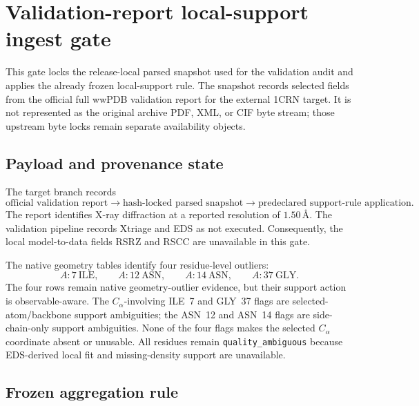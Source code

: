 \section{Validation-report local-support ingest gate}

This gate locks the release-local parsed snapshot used for the validation audit and applies the already frozen local-support rule.  The snapshot records selected fields from the official full wwPDB validation report for the external 1CRN target.  It is not represented as the original archive PDF, XML, or CIF byte stream; those upstream byte locks remain separate availability objects.

\subsection{Payload and provenance state}

The target branch records
\[
\text{official validation report}
\longrightarrow
\text{hash-locked parsed snapshot}
\longrightarrow
\text{predeclared support-rule application}.
\]
The report identifies X-ray diffraction at a reported resolution of $1.50\,\text{\AA}$.  The validation pipeline records Xtriage and EDS as not executed.  Consequently, the local model-to-data fields RSRZ and RSCC are unavailable in this gate.

The native geometry tables identify four residue-level outliers:
\[
A{:}7\ \mathrm{ILE},\qquad
A{:}12\ \mathrm{ASN},\qquad
A{:}14\ \mathrm{ASN},\qquad
A{:}37\ \mathrm{GLY}.
\]
The four rows remain native geometry-outlier evidence, but their support action is
observable-aware.  The $C_\alpha$-involving ILE~7 and GLY~37 flags are
selected-atom/backbone support ambiguities; the ASN~12 and ASN~14 flags are
side-chain-only support ambiguities.  None of the four flags makes the selected
$C_\alpha$ coordinate absent or unusable.  All residues remain
\texttt{quality\_ambiguous} because EDS-derived local fit and missing-density
support are unavailable.

\subsection{Frozen aggregation rule}

